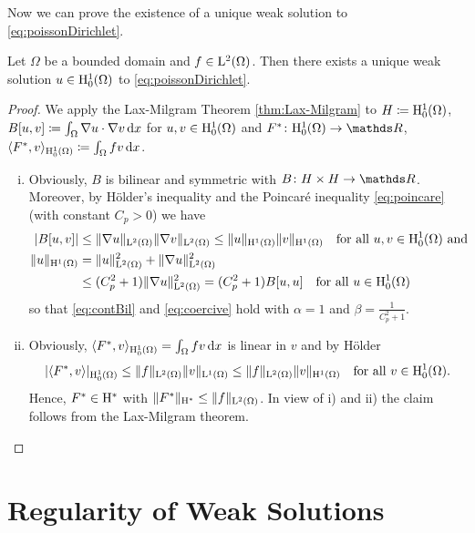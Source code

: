 Now we can prove the existence of a unique weak solution to \eqref{eq:poissonDirichlet}.

\begin{thm}
  Let $\Omega$ be a bounded domain and $f \in \mathrm{L}^2(\Omega)$.
  Then there exists a unique weak solution $u \in \mathrm{H}_0^1(\Omega)$ to \eqref{eq:poissonDirichlet}.
\end{thm}

\begin{proof}
  We apply the Lax-Milgram Theorem \ref{thm:Lax-Milgram} to $H \coloneqq \mathrm{H}_0^1(\Omega)$, $B[u,v] \coloneqq \int_\Omega \nabla u \cdot \nabla v \, {\operatorname{d}\!{x}}$ for $u,v \in \mathrm{H}_0^1(\Omega)$ and $F^* \colon \HH_0^1(\Omega) \to \R$, $\langle F^*, v \rangle_{\mathrm{H}_0^1(\Omega)} \coloneqq \int_\Omega f v \, {\operatorname{d}\!{x}}$.
  \begin{enumerate}[i)]
    \item Obviously, $B$ is bilinear and symmetric with $B \colon H \times H \to \R$.
      Moreover, by Hölder's inequality and the Poincar\'e inequality \eqref{eq:poincare} (with constant $C_p > 0$) we have
      \begin{align*}
        |B[u,v]| 
        &\leq \|\nabla u\|_{\mathrm{L}^2(\Omega)} \|\nabla v\|_{\mathrm{L}^2(\Omega)}
        \leq \|u\|_{\mathrm{H}^1(\Omega)} \|v\|_{\mathrm{H}^1(\Omega)} \quad\text{for all } u, v \in \mathrm{H}_0^1(\Omega) \text{ and } \\
        \|u\|_{\mathrm{H}^1(\Omega)} &= \|u\|_{\mathrm{L}^2(\Omega)}^2 + \|\nabla u\|_{\mathrm{L}^2(\Omega)}^2 \\
        &\leq (C_p^2 + 1) \|\nabla u\|_{\mathrm{L}^2(\Omega)}^2  
        = (C_p^2 + 1) B[u,u] \quad\text{for all } u \in \mathrm{H}_0^1(\Omega)
      \end{align*}
      so that \eqref{eq:contBil} and \eqref{eq:coercive} hold with $\alpha = 1$ and $\beta = \frac{1}{C_p^2 + 1}$.

    \item Obviously, $\langle F^*, v \rangle_{\mathrm{H}_0^1(\Omega)} = \int_\Omega f v \, {\operatorname{d}\!{x}}$ is linear in $v$ and by Hölder
      $$
      |\langle F^*, v \rangle|_{\mathrm{H}_0^1(\Omega)}
      \leq \|f\|_{\mathrm{L}^2(\Omega)} \|v\|_{\mathrm{L}^1(\Omega)}
      \leq \|f\|_{\mathrm{L}^2(\Omega)} \|v\|_{\mathrm{H}^1(\Omega)} \quad\text{for all } v \in \mathrm{H}_0^1(\Omega).
      $$
      Hence, $F^* \in \mathrm{H}^*$ with $\|F^*\|_{\mathrm{H}^*} \leq \| f \|_{\mathrm{L}^2(\Omega)}$.
      In view of i) and ii) the claim follows from the Lax-Milgram theorem. \qedhere
  \end{enumerate}
\end{proof}

\section{Regularity of Weak Solutions}

